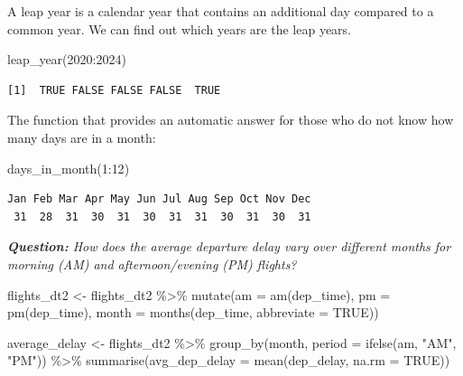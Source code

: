 \documentclass[
  letterpaper,
  DIV=11,
  numbers=noendperiod]{scrartcl}
\newenvironment{Shaded}{\begin{snugshade}}{\end{snugshade}}
\newcommand{\AttributeTok}[1]{\textcolor[rgb]{0.40,0.45,0.13}{#1}}
\newcommand{\ConstantTok}[1]{\textcolor[rgb]{0.56,0.35,0.01}{#1}}
\newcommand{\DecValTok}[1]{\textcolor[rgb]{0.68,0.00,0.00}{#1}}
\newcommand{\FunctionTok}[1]{\textcolor[rgb]{0.28,0.35,0.67}{#1}}
\newcommand{\NormalTok}[1]{\textcolor[rgb]{0.00,0.23,0.31}{#1}}
\newcommand{\OtherTok}[1]{\textcolor[rgb]{0.00,0.23,0.31}{#1}}
\newcommand{\SpecialCharTok}[1]{\textcolor[rgb]{0.37,0.37,0.37}{#1}}
\newcommand{\StringTok}[1]{\textcolor[rgb]{0.13,0.47,0.30}{#1}}
\begin{document}
A leap year is a calendar year that contains an additional day compared
to a common year. We can find out which years are the leap years.

\begin{Shaded}
\begin{Highlighting}[]
\FunctionTok{leap\_year}\NormalTok{(}\DecValTok{2020}\SpecialCharTok{:}\DecValTok{2024}\NormalTok{)}
\end{Highlighting}
\end{Shaded}

\begin{verbatim}
[1]  TRUE FALSE FALSE FALSE  TRUE
\end{verbatim}

The function that provides an automatic answer for those who do not know
how many days are in a month:

\begin{Shaded}
\begin{Highlighting}[]
\FunctionTok{days\_in\_month}\NormalTok{(}\DecValTok{1}\SpecialCharTok{:}\DecValTok{12}\NormalTok{)}
\end{Highlighting}
\end{Shaded}

\begin{verbatim}
Jan Feb Mar Apr May Jun Jul Aug Sep Oct Nov Dec 
 31  28  31  30  31  30  31  31  30  31  30  31 
\end{verbatim}

\emph{\textbf{Question:} How does the average departure delay vary over
different months for morning (AM) and afternoon/evening (PM) flights?}

\begin{Shaded}
\begin{Highlighting}[]
\NormalTok{flights\_dt2 }\OtherTok{\textless{}{-}}\NormalTok{ flights\_dt2 }\SpecialCharTok{\%\textgreater{}\%}
  \FunctionTok{mutate}\NormalTok{(}\AttributeTok{am =} \FunctionTok{am}\NormalTok{(dep\_time),}
         \AttributeTok{pm =} \FunctionTok{pm}\NormalTok{(dep\_time),}
         \AttributeTok{month =} \FunctionTok{months}\NormalTok{(dep\_time, }\AttributeTok{abbreviate =} \ConstantTok{TRUE}\NormalTok{))}

\NormalTok{average\_delay }\OtherTok{\textless{}{-}}\NormalTok{ flights\_dt2 }\SpecialCharTok{\%\textgreater{}\%}
  \FunctionTok{group\_by}\NormalTok{(month, }\AttributeTok{period =} \FunctionTok{ifelse}\NormalTok{(am, }\StringTok{"AM"}\NormalTok{, }\StringTok{"PM"}\NormalTok{)) }\SpecialCharTok{\%\textgreater{}\%}
  \FunctionTok{summarise}\NormalTok{(}\AttributeTok{avg\_dep\_delay =} \FunctionTok{mean}\NormalTok{(dep\_delay, }\AttributeTok{na.rm =} \ConstantTok{TRUE}\NormalTok{))}
\end{Highlighting}
\end{Shaded}
\end{document}
